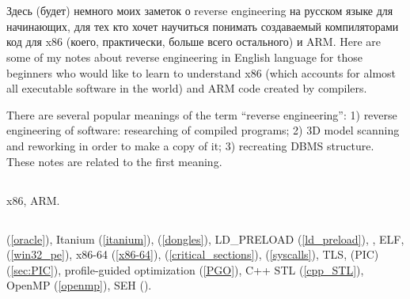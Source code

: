 \chapter{}

\IFRU
{Здесь (будет) немного моих заметок о \gls{reverse engineering} на русском языке для начинающих, 
для тех кто хочет научиться понимать создаваемый \CCpp компиляторами код для x86 (коего, 
практически, больше всего остального) и ARM.}
{Here are some of my notes about \gls{reverse engineering} in English language for 
those beginners who would like to learn to understand x86 (which accounts for almost 
all executable software in the world) and ARM code created by \CCpp compilers.}

{There are several popular meanings of the term ``\gls{reverse engineering}'': 
1) reverse engineering of software: researching of compiled programs;
2) 3D model scanning and reworking in order to make a copy of it;
3) recreating \ac{DBMS} structure.
These notes are related to the first meaning.}

\section{}

x86, ARM.

\section{}

\oracle (\ref{oracle}),
Itanium (\ref{itanium}),
 (\ref{dongles}), 
LD\_PRELOAD (\ref{ld_preload}),
, 
\ac{ELF},
 (\ref{win32_pe}),
x86-64 (\ref{x86-64}),
 (\ref{critical_sections}),
 (\ref{syscalls}), 
\ac{TLS},
 (\ac{PIC}) (\ref{sec:PIC}), 
profile-guided optimization (\ref{PGO}),
C++ STL (\ref{cpp_STL}),
OpenMP (\ref{openmp}),
SEH (\label{sec:SEH}).

